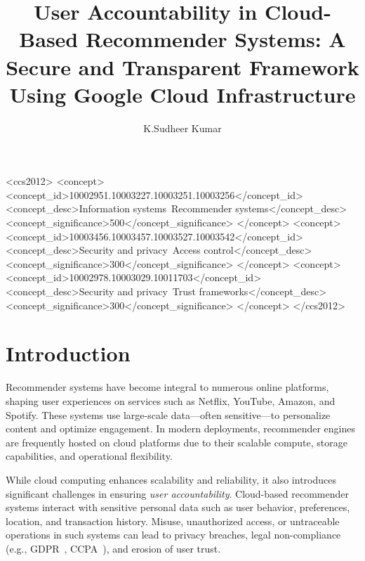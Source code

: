 \documentclass[acmsmall]{acmart}
\title{User Accountability in Cloud-Based Recommender Systems: A Secure and Transparent Framework Using Google Cloud Infrastructure}
\author{K.Sudheer Kumar}
\affiliation{%
  \institution{Department of Computer Science and Engineering, SR University}
  \city{Warangal}
  \state{Telangana}
  \country{India}
}
\begin{document}
\maketitle

\begin{CCSXML}
<ccs2012>
   <concept>
       <concept_id>10002951.10003227.10003251.10003256</concept_id>
       <concept_desc>Information systems~Recommender systems</concept_desc>
       <concept_significance>500</concept_significance>
   </concept>
   <concept>
       <concept_id>10003456.10003457.10003527.10003542</concept_id>
       <concept_desc>Security and privacy~Access control</concept_desc>
       <concept_significance>300</concept_significance>
   </concept>
   <concept>
       <concept_id>10002978.10003029.10011703</concept_id>
       <concept_desc>Security and privacy~Trust frameworks</concept_desc>
       <concept_significance>300</concept_significance>
   </concept>
</ccs2012>
\end{CCSXML}




\section{Introduction}

Recommender systems have become integral to numerous online platforms, shaping user experiences on services such as Netflix, YouTube, Amazon, and Spotify. These systems use large-scale data—often sensitive—to personalize content and optimize engagement. In modern deployments, recommender engines are frequently hosted on cloud platforms due to their scalable compute, storage capabilities, and operational flexibility.

While cloud computing enhances scalability and reliability, it also introduces significant challenges in ensuring \textit{user accountability}. Cloud-based recommender systems interact with sensitive personal data such as user behavior, preferences, location, and transaction history. Misuse, unauthorized access, or untraceable operations in such systems can lead to privacy breaches, legal non-compliance (e.g., GDPR~\cite{gdpr}, CCPA~\cite{ccpa}), and erosion of user trust.
\end{document}
